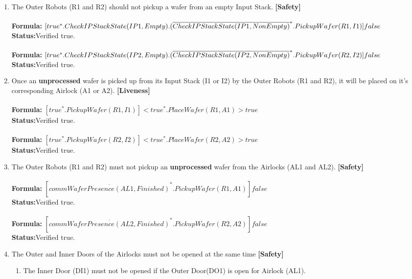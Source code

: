 \documentclass[a4paper,12pt]{article}
\begin{document}
\begin{enumerate}
		
		\item The Outer Robots (R1 and R2) should not pickup a wafer from an empty Input Stack. \textbf{[Safety]}
		\\
		\\\textbf{Formula:} $[true^*.  CheckIPStackState(IP1, Empty).
		\\(\overline{CheckIPStackState(IP1, NonEmpty)}^*.PickupWafer(R1, I1)]false$ \\\textbf{Status:}Verified true.
		\\
		\\\textbf{Formula:} $[true^*.  CheckIPStackState(IP2, Empty).
		\\(\overline{CheckIPStackState(IP2, NonEmpty)}^*.PickupWafer(R2, I2)]false$ \\\textbf{Status:}Verified true.
		
		
		\item Once an \textbf{unprocessed} wafer is picked up from its Input Stack (I1 or I2) by the Outer Robots (R1 and R2), it will be placed on it's corresponding Airlock (A1 or A2). \textbf{[Liveness]}
		\\
		\\\textbf{Formula:} $[true^*.PickupWafer(R1,I1)] <true^*.PlaceWafer(R1,A1)>true$ \\\textbf{Status:}Verified true.
		\\
		\\\textbf{Formula:} $[true^*.PickupWafer(R2,I2)] <true^*.PlaceWafer(R2,A2)>true$ \\\textbf{Status:}Verified true.
		
		
		\item The Outer Robots (R1 and R2) must not pickup an \textbf{unprocessed} wafer from the Airlocks (AL1 and AL2). \textbf{[Safety]}
		\\
		\\\textbf{Formula:} $[\overline{commWaferPresence(AL1,Finished)}^*.PickupWafer(R1,A1)]false $ \\\textbf{Status:}Verified true.
		\\
		\\\textbf{Formula:} $[\overline{commWaferPresence(AL2,Finished)}^*.PickupWafer(R2,A2)]false $ \\\textbf{Status:}Verified true.
		
		
		
		\item The Outer and Inner Doors of the Airlocks must not be opened at the same time \textbf{[Safety]}
		\begin{enumerate}
			\item The Inner Door (DI1) must not be opened if the Outer Door(DO1) is open for Airlock (AL1).
			

\end{enumerate}
\end{enumerate}
\end{document}
